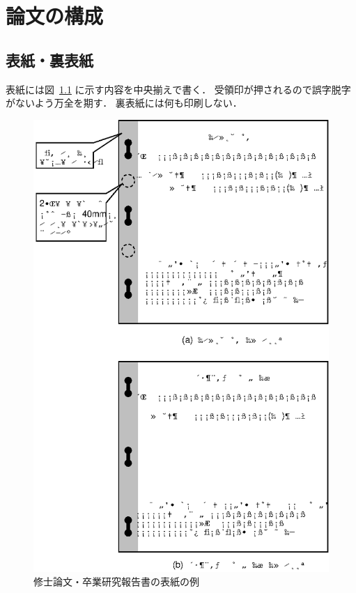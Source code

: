 \documentclass[main]{subfiles}
\begin{document}
\chapter{論文の構成}

\section{表紙・裏表紙}
表紙には図~\ref{fig1} に示す内容を中央揃えで書く．
受領印が押されるので誤字脱字がないよう万全を期す．
裏表紙には何も印刷しない．

\begin{figure}[p] %
\begin{center}
\includegraphics[scale=1.0]{figures/coverpage.eps}
\caption{修士論文・卒業研究報告書の表紙の例}
\label{fig1} %
\end{center}
\end{figure}
\end{document}
